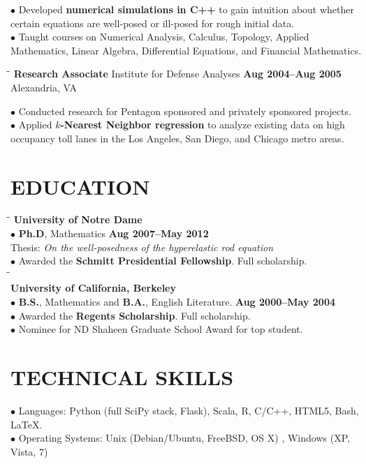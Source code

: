 \documentclass{resume}
\begin{document}
\begin{resume}
$\bullet$ Developed \textbf{numerical simulations in C++}  to gain
intuition about whether certain  equations are well-posed
or ill-posed for rough initial data. \\
$\bullet$ Taught courses on Numerical Analysis, Calculus,
Topology, Applied Mathematics, Linear Algebra,
Differential Equations, and Financial Mathematics.
\begin{tabbing}
\hspace{2.3in}\= \hspace{2.6in}\= \kill
{\bf Research Associate } \> Institute for
Defense Analyses \>  
\textbf{Aug 2004--Aug 2005}\\
    \>Alexandria, VA
\end{tabbing}
$\bullet$ Conducted research for Pentagon sponsored and privately
sponsored projects. 
\\ 
$\bullet$ Applied \textbf{$k$-Nearest Neighbor regression} to analyze existing data on high
occupancy toll lanes in the Los
Angeles, San Diego, and
Chicago metro areas.
\section{EDUCATION} 
\vspace{-0.05mm}
\begin{tabbing}
\hspace{2.3in}\= \hspace{2.6in}\= \kill
\textbf{University of Notre Dame} \\
$\bullet$ \textbf{Ph.D}, Mathematics \>\>\textbf{Aug 2007--May 2012}
\\ 
Thesis: \textit{On the well-posedness of the hyperelastic rod equation} \\
$\bullet$ Awarded the \textbf{Schmitt Presidential Fellowship}. Full scholarship. \\
\hspace{2.3in}\= \hspace{2.6in}\= \kill
\\
\textbf{University of California, Berkeley}
\\
$\bullet$ \textbf{B.S.}, Mathematics  and  \textbf{B.A.}, English Literature.
\>\>\textbf{Aug 2000--May 2004}
\\
$\bullet$ Awarded the \textbf{Regents Scholarship}. Full scholarship.
\\
$\bullet$ Nominee for ND Shaheen Graduate School Award for top student.
\end{tabbing}
\section{TECHNICAL SKILLS}
\vspace{-0.05mm}
\begin{tabbing}
$\bullet$ Languages: Python (full SciPy stack, Flask), Scala,  R, C/C++,
HTML5, Bash, \LaTeX{}.
\\
$\bullet$ Operating Systems: Unix (Debian/Ubuntu, FreeBSD, OS X) , Windows (XP, Vista, 7) 
\end{tabbing}


\end{resume}
\end{document}
